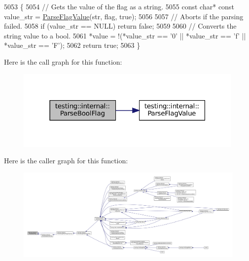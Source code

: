 \begin{DoxyCode}
5053                                                                    \{
5054   \textcolor{comment}{// Gets the value of the flag as a string.}
5055   \textcolor{keyword}{const} \textcolor{keywordtype}{char}* \textcolor{keyword}{const} value\_str = \hyperlink{namespacetesting_1_1internal_a8bfd56af5e4a89bfb76f7e1723e41b03}{ParseFlagValue}(str, flag, \textcolor{keyword}{true});
5056 
5057   \textcolor{comment}{// Aborts if the parsing failed.}
5058   \textcolor{keywordflow}{if} (value\_str == NULL) \textcolor{keywordflow}{return} \textcolor{keyword}{false};
5059 
5060   \textcolor{comment}{// Converts the string value to a bool.}
5061   *value = !(*value\_str == \textcolor{charliteral}{'0'} || *value\_str == \textcolor{charliteral}{'f'} || *value\_str == \textcolor{charliteral}{'F'});
5062   \textcolor{keywordflow}{return} \textcolor{keyword}{true};
5063 \}
\end{DoxyCode}
Here is the call graph for this function\+:
\nopagebreak
\begin{figure}[H]
\begin{center}
\leavevmode
\includegraphics[width=316pt]{namespacetesting_1_1internal_ada3b98e7cfe93f4ba2053c470d9e3e51_cgraph}
\end{center}
\end{figure}
Here is the caller graph for this function\+:
\nopagebreak
\begin{figure}[H]
\begin{center}
\leavevmode
\includegraphics[width=350pt]{namespacetesting_1_1internal_ada3b98e7cfe93f4ba2053c470d9e3e51_icgraph}
\end{center}
\end{figure}
\mbox{\label{namespacetesting_1_1internal_a8bfd56af5e4a89bfb76f7e1723e41b03}} 
